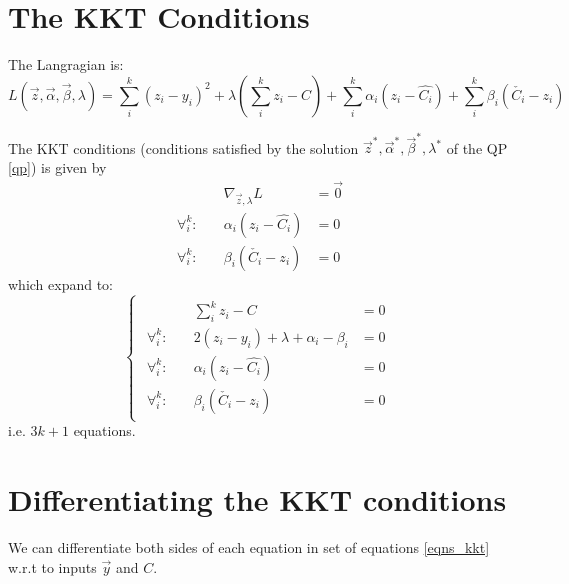 \documentclass[11 pt]{article}
\begin{document}
\section{The KKT Conditions}

The Langragian is:
\begin{equation}
    L(\vec{z},\vec{\alpha},\vec{\beta},\lambda) = \sum_i^k (z_i-y_i)^2 + \lambda (\sum_i^k z_i - C) + \sum_i^k \alpha_i(z_i - \hat{C_i}) + \sum_i^k \beta_i(\check{C_i} - z_i)
\end{equation}

The KKT conditions (conditions satisfied by the solution $\vec{z}^*, \vec{\alpha}^*, \vec{\beta}^*, \lambda^*$ of the QP \ref{qp}) is given by
\begin{align*}
    &\nabla_{\vec{z},\lambda} L & = \vec{0} \\
    \forall_i^k : \quad &\alpha_i(z_i - \hat{C_i}) & = 0 \\
    \forall_i^k : \quad &\beta_i(\check{C_i} - z_i) & = 0
\end{align*}
which expand to:
\begin{equation}\label{eqns_kkt}
    \begin{cases}
        \begin{aligned}
            &\sum_i^k z_i - C & = 0 \\
            \forall_i^k : \quad & 2(z_i-y_i) + \lambda + \alpha_i - \beta_i & = 0 \\
            \forall_i^k : \quad & \alpha_i(z_i - \hat{C_i}) & = 0 \\
            \forall_i^k : \quad & \beta_i(\check{C_i} - z_i) & = 0
        \end{aligned}
    \end{cases}
\end{equation}
i.e. $3k + 1$ equations.


\section{Differentiating the KKT conditions}

We can differentiate both sides of each equation in set of equations \ref{eqns_kkt} w.r.t to inputs $\vec{y}$ and $C$.
\end{document}
